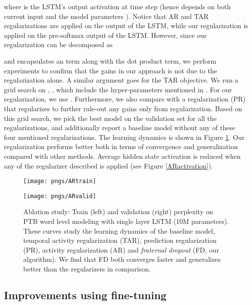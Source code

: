 \documentclass{article} \usepackage{iclr2018_conference,times}
\begin{document}
where  is the LSTM's output activation at time step  (hence depends on both current input  and the model parameters ). Notice that AR and TAR regularizations are applied on the output of the LSTM, while our regularization is applied on the pre-softmax output  of the LSTM. However, since our regularization can be decomposed as

and encapsulates an  term along with the dot product term, we perform experiments to confirm that the gains in our approach is not due to the  regularization alone. A similar argument goes for the TAR objective. We run a grid search on , , which include the hyper-parameters mentioned in \cite{merity2017regularizing}. For our regularization, we use . Furthermore, we also compare with a regularization (PR) that regularizes  to further rule-out any gains only from  regularization. Based on this grid search, we pick the best model on the validation set for all the regularizations, and additionally report a baseline model without any of these four mentioned regularizations. The learning dynamics is shown in Figure \ref{fig_ar_tar}. Our regularization performs better both in terms of convergence and generalization compared with other methods. Average hidden state activation is reduced when any of the regularizer described is applied (see Figure \ref{ARactivation}).

\begin{figure}[t]
\vspace{-0.08cm}
  \centering
  \begin{minipage}[b]{0.48\textwidth}
    \texttt{[image: pngs/ARtrain]}
  \end{minipage}
  \hfill
  \begin{minipage}[b]{0.48\textwidth}
    \texttt{[image: pngs/ARvalid]}
  \end{minipage}
  \caption{Ablation study: Train (left) and validation (right) perplexity on PTB word level modeling with single layer LSTM (10M parameters). These curves study the learning dynamics of the baseline model, temporal activity regularization (TAR), prediction regularization (PR), activity regularization (AR) and \emph{fraternal dropout} (FD, our algorithm). We find that FD both converges faster and generalizes better than the regularizers in comparison.}
\label{fig_ar_tar}
\vspace{-0.08cm}
\end{figure}

\subsection{Improvements using fine-tuning}
\label{finetuning}
\end{document}
